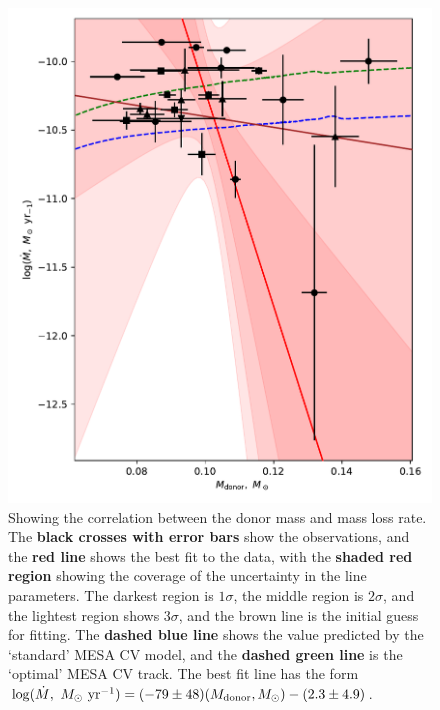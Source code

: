 \begin{figure}
    \centering
    \includegraphics[width=\textwidth]{figures/results/Mdot/Mr_Mdot.pdf}
    \caption{Showing the correlation between the donor mass and mass loss rate. The {\bf black crosses with error bars} show the observations, and the {\bf red line} shows the best fit to the data, with the {\bf shaded red region} showing the coverage of the uncertainty in the line parameters. The darkest region is $1\sigma$, the middle region is $2\sigma$, and the lightest region shows $3\sigma$, and the {\rm brown line} is the initial guess for fitting. The {\bf dashed blue line} shows the value predicted by the `standard' MESA CV model, and the {\bf dashed green line} is the `optimal' MESA CV track. The best fit line has the form $\log (\dot M,\ M_\odot\ {\rm yr}^{-1}) = (-79\pm48) (M_{\rm donor}, M_\odot) - (2.3\pm4.9)$. }
    \label{fig:discussion:donor mass vs Mdot fit}
\end{figure}
